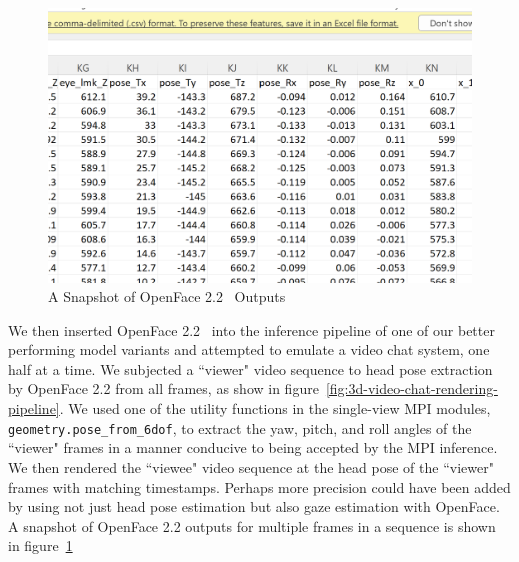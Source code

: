 \begin{figure}[!h]
    \includegraphics[width=0.75\columnwidth]{figures/openface-csv.png}
    \caption{A Snapshot of OpenFace 2.2~\cite{baltrusaitis_openface_2018} Outputs}
    \label{fig:openface-outputs}
\end{figure}

We then inserted OpenFace 2.2~\cite{baltrusaitis_openface_2018} into the inference pipeline of one of our better performing model variants and attempted to emulate a video chat system, one half at a time. We subjected a ``viewer" video sequence to head pose extraction by OpenFace 2.2 from all frames, as show in figure~\ref{fig:3d-video-chat-rendering-pipeline}. We used one of the utility functions in the single-view MPI modules, \texttt{geometry.pose\_from\_6dof}, to extract the yaw, pitch, and roll angles of the ``viewer" frames in a manner conducive to being accepted by the MPI inference. We then rendered the ``viewee" video sequence at the head pose of the ``viewer" frames with matching timestamps. Perhaps more precision could have been added by using not just head pose estimation but also gaze estimation with OpenFace. A snapshot of OpenFace 2.2 outputs for multiple frames in a sequence is shown in figure~\ref{fig:openface-outputs}